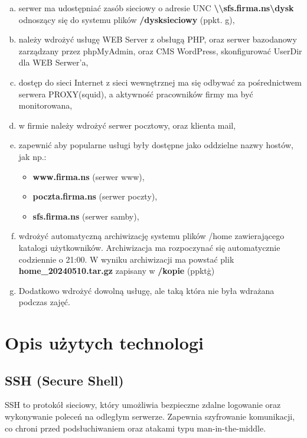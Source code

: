 \documentclass[a4paper]{article}
\begin{document}
\begin{enumerate}[a)]
      \item  serwer ma udostępniać zasób sieciowy o adresie UNC \textbf{\textbackslash \textbackslash sfs.firma.ns\textbackslash dysk} odnoszący się do systemu plików \textbf{/dysksieciowy} (ppkt. g),
      \item należy wdrożyć usługę WEB Server z obsługą PHP, oraz serwer bazodanowy zarządzany przez
            phpMyAdmin, oraz CMS WordPress, skonfigurować UserDir dla WEB Serwer'a,
      \item dostęp do sieci Internet z sieci wewnętrznej ma się odbywać za pośrednictwem serwera
            PROXY(squid), a aktywność pracowników firmy ma być monitorowana,
      \item w firmie należy wdrożyć serwer pocztowy, oraz klienta mail,
      \item zapewnić aby popularne usługi były dostępne jako oddzielne nazwy hostów, jak np.:
            \begin{itemize}
                  \item \textbf{www.firma.ns} (serwer www),
                  \item \textbf{poczta.firma.ns} (serwer poczty),
                  \item \textbf{sfs.firma.ns} (serwer samby),
            \end{itemize}
      \item wdrożyć automatyczną archiwizację systemu plików /home zawierającego katalogi użytkowników. Archiwizacja ma rozpoczynać się automatycznie codziennie o 21:00. W wyniku archiwizacji ma powstać plik\\ \textbf{home\_20240510.tar.gz} zapisany w \textbf{/kopie} (ppkt\. g)
      \item Dodatkowo wdrożyć dowolną usługę, ale taką która nie była wdrażana podczas zajęć.

\end{enumerate}
\section{Opis użytych technologi}
\subsection{SSH (Secure Shell)}
SSH to protokół sieciowy, który umożliwia bezpieczne zdalne logowanie oraz wykonywanie poleceń na odległym serwerze. Zapewnia szyfrowanie komunikacji, co chroni przed podsłuchiwaniem oraz atakami typu man-in-the-middle.
\end{document}
